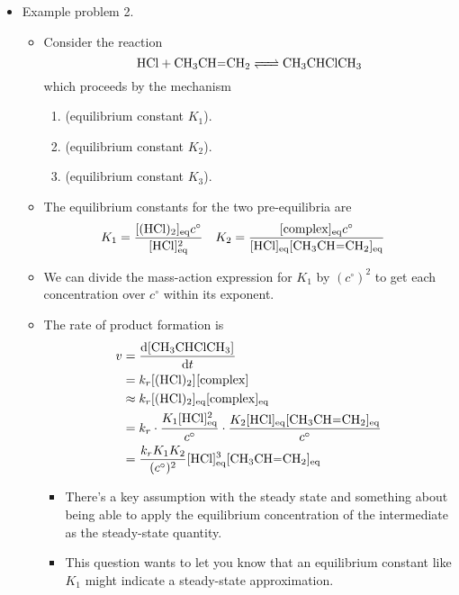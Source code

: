 \documentclass[../notes.tex]{subfiles}
\begin{document}
\begin{itemize}
    \item Example problem 2.
    \begin{itemize}
        \item Consider the reaction
        \begin{equation*}
            \ce{HCl + CH3CH=CH2 <=> CH3CHClCH3}
        \end{equation*}
        which proceeds by the mechanism
        \begin{enumerate}
            \item {} (equilibrium constant $K_1$).
            \item {} (equilibrium constant $K_2$).
            \item {} (equilibrium constant $K_3$).
        \end{enumerate}
        \item The equilibrium constants for the two pre-equilibria are
        \begin{align*}
            K_1 &= \frac{\cnc[eq]{(HCl)2}c^\circ}{\cnc[eq]{HCl}^2}&
            K_2 &= \frac{\cnc[eq]{complex}c^\circ}{\cnc[eq]{HCl}\cnc[eq]{CH3CH=CH2}}
        \end{align*}
        \item We can divide the mass-action expression for $K_1$ by $(c^\circ)^2$ to get each concentration over $c^\circ$ within its exponent.
        \item The rate of product formation is
        \begin{align*}
            v &= \dv{\cnc{CH3CHClCH3}}{t}\\
            &= k_r\cnc{(HCl)2}\cnc{complex}\\
            &\approx k_r\cnc[eq]{(HCl)2}\cnc[eq]{complex}\\
            &= k_r\cdot\frac{K_1\cnc[eq]{HCl}^2}{c^\circ}\cdot\frac{K_2\cnc[eq]{HCl}\cnc[eq]{CH3CH=CH2}}{c^\circ}\\
            &= \frac{k_rK_1K_2}{(c^\circ)^2}\cnc[eq]{HCl}^3\cnc[eq]{CH3CH=CH2}
        \end{align*}
        \begin{itemize}
            \item There's a key assumption with the steady state and something about being able to apply the equilibrium concentration of the intermediate as the steady-state quantity.
            \item This question wants to let you know that an equilibrium constant like $K_1$ might indicate a steady-state approximation.

\end{itemize}
\end{itemize}
\end{itemize}
\end{document}
